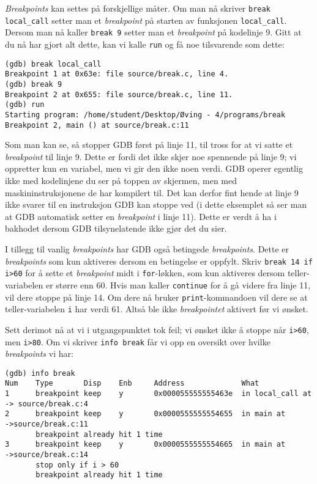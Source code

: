 \textit{Breakpoints} kan settes på forskjellige måter. Om man nå skriver \verb|break local_call| setter man et \textit{breakpoint} på starten av funksjonen \verb|local_call|. Dersom man nå kaller \verb|break 9| setter man et \textit{breakpoint} på kodelinje 9. Gitt at du nå har gjort alt dette, kan vi kalle \verb|run| og få noe tilsvarende som dette:

\begin{lstlisting}[mathescape=true,keywordstyle=\color{black}]
(gdb) break local_call
Breakpoint 1 at 0x63e: file source/break.c, line 4.
(gdb) break 9
Breakpoint 2 at 0x655: file source/break.c, line 11.
(gdb) run
Starting program: /home/student/Desktop/Øving - 4/programs/break
Breakpoint 2, main () at source/break.c:11
\end{lstlisting}


Som man kan se, så stopper GDB først på linje 11, til tross for at vi satte et \textit{breakpoint} til linje 9. Dette er fordi det ikke skjer noe spennende på linje 9; vi oppretter kun en variabel, men vi gir den ikke noen verdi. GDB operer egentlig ikke med kodelinjene du ser på toppen av skjermen, men med maskininstruksjonene de har kompilert til. Det kan derfor fint hende at linje 9 ikke svarer til en instruksjon GDB kan stoppe ved (i dette eksemplet så ser man at GDB automatisk setter en \textit{breakpoint} i linje 11). Dette er verdt å ha i bakhodet dersom GDB tilsynelatende ikke gjør det du sier.

I tillegg til vanlig \textit{breakpoints} har GDB også betingede \textit{breakpoints}. Dette er \textit{breakpoints} som kun aktiveres dersom en betingelse er oppfylt. Skriv \verb|break 14 if| \verb|i>60| for å sette et \textit{breakpoint} midt i \verb|for|-løkken, som kun aktiveres dersom teller-variabelen er større enn 60. Hvis man kaller \verb|continue| for å gå videre fra linje 11, vil dere stoppe på linje 14. Om dere nå bruker \verb|print|-kommandoen vil dere se at teller-variabelen \verb|i| har verdi 61. Altså ble ikke \textit{breakpointet} aktivert før vi ønsket.

Sett derimot nå at vi i utgangspunktet tok feil; vi ønsket ikke å stoppe når \verb|i>60|, men \verb|i>80|. Om vi skriver \verb|info break| får vi opp en oversikt over hvilke \textit{breakpoints} vi har:

\begin{lstlisting}[mathescape=true,keywordstyle=\color{black}]
(gdb) info break
Num    Type       Disp    Enb     Address             What
1      breakpoint keep    y       0x000055555555463e  in local_call at
-> source/break.c:4
2      breakpoint keep    y       0x0000555555554655  in main at
->source/break.c:11
       breakpoint already hit 1 time
3      breakpoint keep    y       0x0000555555554665  in main at
->source/break.c:14
       stop only if i > 60
       breakpoint already hit 1 time
\end{lstlisting}

